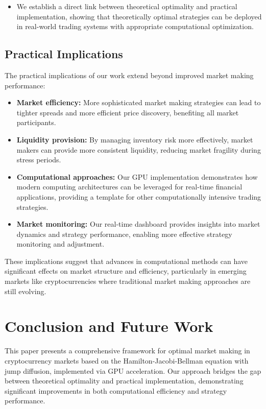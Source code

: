 \documentclass[twocolumn,ieee]{arithmaxresearch}
\begin{document}
\begin{onecolumn}
\begin{twocolumn}
\begin{itemize}
    \item We establish a direct link between theoretical optimality and practical implementation, showing that theoretically optimal strategies can be deployed in real-world trading systems with appropriate computational optimization.
\end{itemize}

\subsection{Practical Implications}

The practical implications of our work extend beyond improved market making performance:

\begin{itemize}
    \item \textbf{Market efficiency:} More sophisticated market making strategies can lead to tighter spreads and more efficient price discovery, benefiting all market participants.
    
    \item \textbf{Liquidity provision:} By managing inventory risk more effectively, market makers can provide more consistent liquidity, reducing market fragility during stress periods.
    
    \item \textbf{Computational approaches:} Our GPU implementation demonstrates how modern computing architectures can be leveraged for real-time financial applications, providing a template for other computationally intensive trading strategies.
    
    \item \textbf{Market monitoring:} Our real-time dashboard provides insights into market dynamics and strategy performance, enabling more effective strategy monitoring and adjustment.
\end{itemize}

These implications suggest that advances in computational methods can have significant effects on market structure and efficiency, particularly in emerging markets like cryptocurrencies where traditional market making approaches are still evolving.

\section{Conclusion and Future Work}

This paper presents a comprehensive framework for optimal market making in cryptocurrency markets based on the Hamilton-Jacobi-Bellman equation with jump diffusion, implemented via GPU acceleration. Our approach bridges the gap between theoretical optimality and practical implementation, demonstrating significant improvements in both computational efficiency and strategy performance.


\end{twocolumn}
\end{onecolumn}
\end{document}
